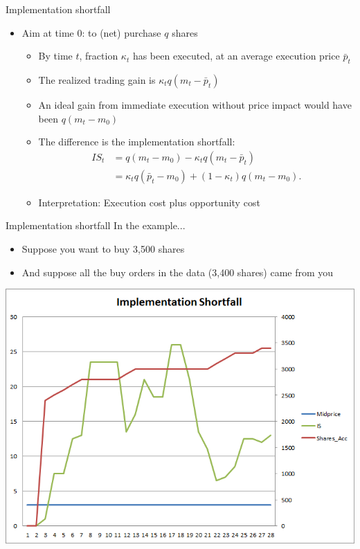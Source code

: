 \documentclass[english,10pt]{beamer}
\begin{document}
\begin{frame}{Implementation shortfall}
	\begin{itemize}
		\item Aim at time 0: to (net) purchase $q$ shares
		\begin{itemize}
			\item By time $t$, fraction $\kappa_t$ has been executed, at an average execution price $\bar{p}_t$
			\item The realized trading gain is $\kappa_t q(m_t-\bar{p}_t)$
			\item An ideal gain from immediate execution without price impact would have been $q(m_t - m_0)$
			\item The difference is the \alert{implementation shortfall}:
			\begin{align*}
			IS_t 
			& = q(m_t-m_0) - \kappa_t q (m_t - \bar{p}_t) \\
			& = \kappa_t q(\bar{p}_t - m_0) + (1-\kappa_t) q (m_t - m_0).
			\end{align*}
			\item Interpretation: Execution cost plus opportunity cost
		\end{itemize}
	\end{itemize}
\end{frame}


\begin{frame}{Implementation shortfall}
	In the example... 
	\begin{itemize}
		\item Suppose you want to buy 3,500 shares
		\item And suppose all the buy orders in the data (3,400 shares) came from you
	\end{itemize}
	\center
	\includegraphics[scale=0.39]{pics/L2_is}
\end{frame}
\end{document}
